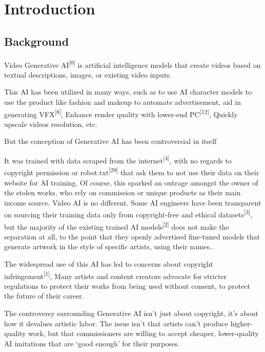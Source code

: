 \chapter{Introduction}
\label{chap:introduction}

\section{Background}
\label{section:background}

Video Generative AI\textsuperscript{[0]} is artificial intelligence models that create videos based on textual descriptions, images, or existing video inputs. \newline

This AI has been utilized in many ways, such as to use AI character models to use the product like fashion and makeup to automate advertisement, aid in generating VFX\textsuperscript{[8]}, Enhance render quality with lower-end PC\textsuperscript{[12]}, Quickly upscale videos resolution, etc.\newline

But the conception of Generative AI has been controversial in itself

It was trained with data scraped from the internet\textsuperscript{[4]}, with no regards to copyright permission or robot.txt\textsuperscript{[29]} that ask them to not use their data on their website for AI training. Of course, this sparked an outrage amongst the owner of the stolen works, who rely on commission or unique products as their main income source. Video AI is no different. Some AI engineers have been transparent on sourcing their training data only from copyright-free and ethical datasets\textsuperscript{[3]}, but the majority of the existing trained AI models\textsuperscript{[2]} does not make the separation at all, to the point that they openly advertised fine-tuned models that generate artwork in the style of specific artists, using their names..\newline

The widespread use of this AI has led to concerns about copyright infringement\textsuperscript{[1]}, Many artists and content creators advocate for stricter regulations to protect their works from being used without consent, to protect the future of their career. \newline

The controversy surrounding Generative AI isn’t just about copyright, it’s about how it devalues artistic labor. The issue isn’t that artists can’t produce higher-quality work, but that commissioners are willing to accept cheaper, lower-quality AI imitations that are ‘good enough’ for their purposes.\newline


